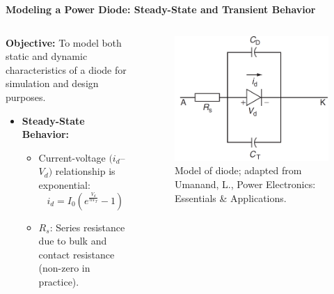 \begin{frame}{\textbf{Modeling a Power Diode: Steady-State and Transient Behavior}}
    \begin{columns}
        \begin{column}{0.48\textwidth}
            \textbf{Objective:} To model both static and dynamic characteristics of a diode for simulation and design purposes.
            \vspace{0.5em}
            \begin{itemize}
                \item \textbf{Steady-State Behavior:}
                \begin{itemize}
                    \item Current-voltage $(i_d$–$V_d)$ relationship is exponential:
                    \[
                        i_d = I_0\left(e^{\frac{V_d}{nV_T}} - 1\right)
                    \]
                    \item $R_s$: Series resistance due to bulk and contact resistance (non-zero in practice).
                \end{itemize}
            \end{itemize}
        \end{column}
        
        \begin{column}{0.48\textwidth}
            \begin{figure}
                \centering
                \includegraphics[scale=0.25]{fig/lec04/diode_model.png}
                \caption{Model of diode; adapted from Umanand, L., Power Electronics: Essentials \& Applications.}
                \label{fig:diode_model}
            \end{figure}
        \end{column}
    \end{columns}
    \end{frame}
    

